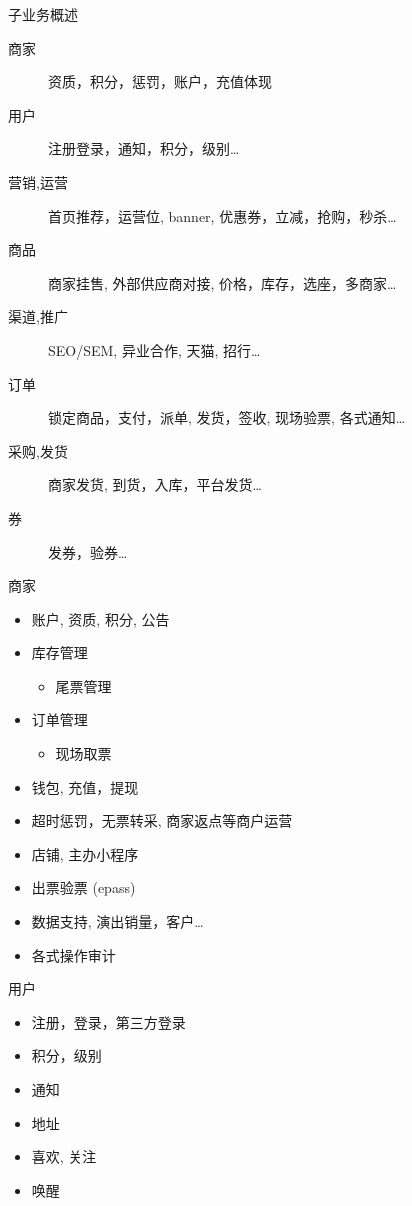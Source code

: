 \documentclass[presentation, bigger]{beamer}
\begin{document}
\begin{frame}[label={sec:org4bad73e}]{子业务概述}
\begin{description}
\item[{商家}] 资质，积分，惩罚，账户，充值体现
\item[{用户}] 注册登录，通知，积分，级别\ldots{}
\item[{营销,运营}] 首页推荐，运营位, banner, 优惠券，立减，抢购，秒杀\ldots{}
\item[{商品}] 商家挂售, 外部供应商对接, 价格，库存，选座，多商家\ldots{}
\item[{渠道,推广}] SEO/SEM, 异业合作, 天猫, 招行\ldots{}
\item[{订单}] 锁定商品，支付，派单, 发货，签收, 现场验票, 各式通知\ldots{}
\item[{采购,发货}] 商家发货, 到货，入库，平台发货\ldots{}
\item[{券}] 发券，验券\ldots{}
\end{description}
\end{frame}


\begin{frame}[label={sec:orgf7de671}]{商家}
\begin{itemize}
\item \alert{账户, 资质, 积分, 公告}
\item \alert{库存管理}
\begin{itemize}
\item 尾票管理
\end{itemize}
\item \alert{订单管理}
\begin{itemize}
\item 现场取票
\end{itemize}
\item \alert{钱包, 充值，提现}
\item 超时惩罚，无票转采, 商家返点等商户运营
\item 店铺, 主办小程序
\item 出票验票 (epass)
\item 数据支持, 演出销量，客户\ldots{}
\item 各式操作审计
\end{itemize}
\end{frame}

\begin{frame}[label={sec:org04aeba4}]{用户}
\begin{itemize}
\item 注册，登录，第三方登录
\item 积分，级别
\item 通知
\item 地址
\item 喜欢, 关注
\item 唤醒
\end{itemize}
\end{frame}
\end{document}
